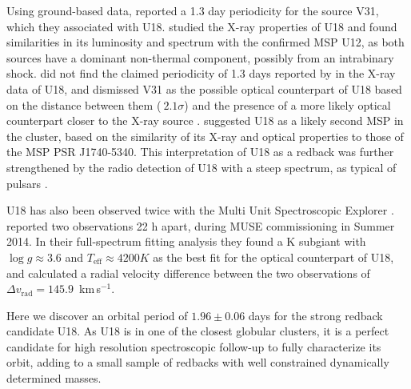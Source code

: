 \documentclass[fleqn,usenatbib,useAMS,letters]{mnras}
\newcommand{\kms}{\,km\,s$^{-1}$} %
\begin{document}
Using ground-based data, \cite{kaluzny_photometric_2006} reported a 1.3 day periodicity for the source V31, which they associated with U18. %
\cite{bogdanov_chandra_2010} studied the X-ray properties of U18 and found similarities in its luminosity and spectrum with the confirmed MSP U12, as both sources have a dominant non-thermal component, possibly from  an intrabinary shock.  \cite{bogdanov_chandra_2010} did not find the claimed periodicity of 1.3 days reported by \cite{kaluzny_photometric_2006} in the X-ray data of U18, and dismissed V31 as the possible optical counterpart of U18 based on the distance between them ($~2.1 \sigma$) and the presence of a more likely optical counterpart closer to the X-ray source \citep{grindlay_chandra_2001}. 
 \cite{bogdanov_chandra_2010} suggested U18 as a likely second MSP in the cluster, based on the similarity of its X-ray and optical properties to those of the MSP PSR J1740-5340. 
 This interpretation of U18 as a redback was further strengthened by %
the radio detection of U18 with a steep spectrum, as typical of pulsars 
\citep{CoryPaper}.

U18 has also been  observed twice with the Multi Unit Spectroscopic Explorer  \citep[MUSE][]{MUSECommissioning}. \cite{Husser2016MUSE}  reported two observations 22 h apart, during MUSE commissioning in Summer 2014. In their full-spectrum fitting analysis they found a K subgiant with  $\log g \approx 3.6$ and $T_{\text{eff}} \approx 4200 K$ as the best fit for the optical counterpart of U18, and calculated a radial velocity difference between the two observations of $ \Delta  v_{\text{rad}} =   145.9$ \kms. 



Here we %
discover an orbital period of $1.96 \pm 0.06$ days for the strong redback candidate U18.   As U18 is in one of the closest globular clusters, %
it is a perfect candidate for high resolution spectroscopic follow-up to fully characterize its orbit, adding to a small sample of redbacks with well constrained dynamically determined masses.
\end{document}
